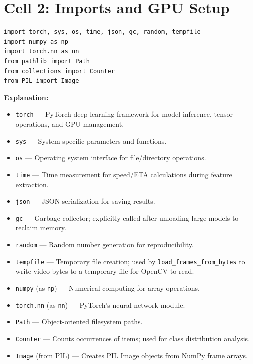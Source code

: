 \documentclass[a4paper, 12pt]{article}
\newenvironment{explanation}{%
  \par\smallskip
  \noindent\textcolor{blue!70!black}{\textbf{Explanation:}}\\
  \noindent
}{\par\medskip}
\begin{document}
\newpage
\section{Cell 2: Imports and GPU Setup}

\begin{lstlisting}
import torch, sys, os, time, json, gc, random, tempfile
import numpy as np
import torch.nn as nn
from pathlib import Path
from collections import Counter
from PIL import Image
\end{lstlisting}

\begin{explanation}
\begin{itemize}[nosep]
  \item \texttt{torch} --- PyTorch deep learning framework for model inference, tensor operations, and GPU management.
  \item \texttt{sys} --- System-specific parameters and functions.
  \item \texttt{os} --- Operating system interface for file/directory operations.
  \item \texttt{time} --- Time measurement for speed/ETA calculations during feature extraction.
  \item \texttt{json} --- JSON serialization for saving results.
  \item \texttt{gc} --- Garbage collector; explicitly called after unloading large models to reclaim memory.
  \item \texttt{random} --- Random number generation for reproducibility.
  \item \texttt{tempfile} --- Temporary file creation; used by \texttt{load\_frames\_from\_bytes} to write video bytes to a temporary file for OpenCV to read.
  \item \texttt{numpy} (as \texttt{np}) --- Numerical computing for array operations.
  \item \texttt{torch.nn} (as \texttt{nn}) --- PyTorch's neural network module.
  \item \texttt{Path} --- Object-oriented filesystem paths.
  \item \texttt{Counter} --- Counts occurrences of items; used for class distribution analysis.
  \item \texttt{Image} (from PIL) --- Creates PIL Image objects from NumPy frame arrays.
\end{itemize}
\end{explanation}
\end{document}

